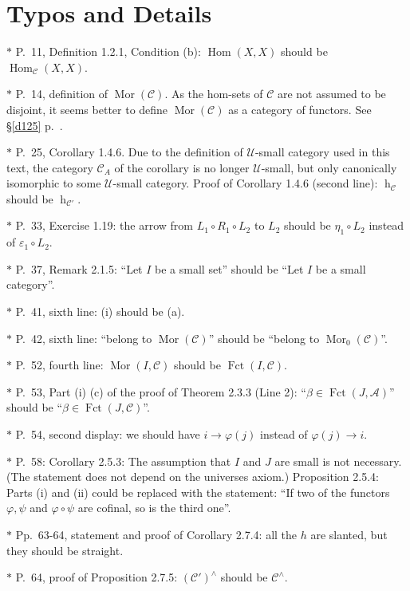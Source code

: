 \documentclass[12pt]{article}%
\theoremstyle{remark}
\theoremstyle{definition}
\newcommand{\oo}{\operatorname}
\newcommand{\A}{\mathcal A}
\newcommand{\C}{\mathcal C}
\newcommand{\U}{\mathcal U}
\DeclareMathOperator{\hy}{h}
\DeclareMathOperator{\Hom}{Hom}%
\DeclareMathOperator{\Mor}{Mor}
\begin{document}
\section{Typos and Details}

$*$ P.~11, Definition 1.2.1, Condition (b): $\Hom(X,X)$ should be $\Hom_{\C}(X,X)$. 

\noindent $*$ P.~14, definition of $\Mor(\C)$. As the hom-sets of $\C$ are not assumed to be disjoint, it seems better to define $\Mor(\C)$ as a category of functors. See \S\ref{d125} p.~\pageref{d125}.

%

\noindent $*$ P.~25, Corollary 1.4.6. Due to the definition of $\U$-small category used in this text, the category $\C_A$ of the corollary is no longer $\U$-small, but only canonically isomorphic to some $\U$-small category. Proof of Corollary 1.4.6 (second line): $\hy_{\C}$ should be $\hy_{\C'}$. 

\noindent $*$ P.~33, Exercise 1.19: the arrow from $L_1\circ R_1\circ L_2$ to $L_2$ should be $\eta_1\circ L_2$ instead of $\varepsilon_1\circ L_2$. 

\noindent $*$ P.~37, Remark 2.1.5: ``Let $I$ be a small set'' should be ``Let $I$ be a small category''.

\noindent $*$ P.~41, sixth line: (i) should be (a).

\noindent $*$ P.~42, sixth line: ``belong to $\Mor(\C)$'' should be ``belong to $\Mor_0(\C)$''.

\noindent $*$ P.~52, fourth line: $\Mor(I,\C)$ should be $\oo{Fct}(I,\C)$.

\noindent $*$ P.~53, Part (i) (c) of the proof of Theorem 2.3.3 (Line 2): ``$\beta\in\oo{Fct}(J,\A)$'' should be ``$\beta\in\oo{Fct}(J,\C)$''.

\noindent $*$ P.~54, second display: we should have $i\to\varphi(j)$ instead of $\varphi(j)\to i$.

\noindent $*$ P.~58: Corollary 2.5.3: The assumption that $I$ and $J$ are small is not necessary. (The statement does not depend on the universes axiom.) Proposition 2.5.4: Parts (i) and (ii) could be replaced with the statement: ``If two of the functors $\varphi,\psi$ and $\varphi\circ\psi$ are cofinal, so is the third one''.

\noindent $*$ Pp.~63-64, statement and proof of Corollary 2.7.4: all the $h$ are slanted, but they should be straight.

\noindent $*$ P.~64, proof of Proposition 2.7.5: $(\C')^\wedge$ should be $\C^\wedge$.
\end{document}
